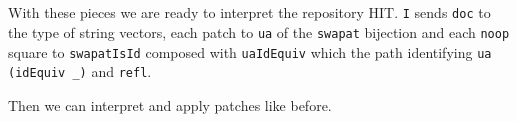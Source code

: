 \begin{code}
\AgdaSpace{}%
\AgdaSpace{}%
\AgdaSpace{}%
\AgdaOperator{\AgdaFunction{[}}\AgdaSpace{}%
\AgdaSpace{}%
\AgdaOperator{\AgdaFunction{]\%=}}\AgdaSpace{}%
\AgdaSpace{}%
\AgdaSymbol{)}\AgdaSpace{}%
\AgdaSymbol{(}\AgdaSpace{}%
\AgdaSymbol{)}\AgdaSpace{}%
\AgdaSpace{}%
\AgdaSpace{}%
\AgdaOperator{\AgdaFunction{[}}\AgdaSpace{}%
\AgdaSpace{}%
\AgdaOperator{\AgdaFunction{]\%=}}\AgdaSpace{}%
\<%
\\
%
\>[16]\AgdaSpace{}%
\AgdaSpace{}%
\AgdaSpace{}%
\AgdaSpace{}%
\AgdaSpace{}%
\<%
\\
%
\\[\AgdaEmptyExtraSkip]%
\>[0]\AgdaSpace{}%
\AgdaSymbol{:}\AgdaSpace{}%
\AgdaSymbol{\{}\AgdaSpace{}%
\AgdaSymbol{:}\AgdaSpace{}%
\AgdaSymbol{\}}\AgdaSpace{}%
\AgdaSymbol{\{}\AgdaSpace{}%
\AgdaSymbol{:}\AgdaSpace{}%
\AgdaSpace{}%
\AgdaSymbol{\}}\AgdaSpace{}%
\AgdaSpace{}%
\AgdaSpace{}%
\AgdaSymbol{(}\AgdaSpace{}%
\AgdaOperator{\AgdaInductiveConstructor{,}}\AgdaSpace{}%
\AgdaSymbol{)}\AgdaSpace{}%
\AgdaSpace{}%
\AgdaSpace{}%
\AgdaSpace{}%
\<%
\\
\>[0]\AgdaSpace{}%
\AgdaSymbol{=}\AgdaSpace{}%
\AgdaSpace{}%
\<%
\end{code}

With these pieces we are ready to interpret the repository HIT.
\texttt{I} sends \texttt{doc} to the type of string vectors, each patch to \texttt{ua} of the
\texttt{swapat} bijection and each \texttt{noop} square to \texttt{swapatIsId} composed with
\texttt{uaIdEquiv} which the path identifying \texttt{ua (idEquiv \_)} and \texttt{refl}.

Then we can interpret and apply patches like before.

